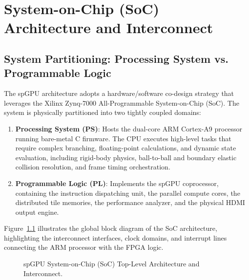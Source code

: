 \chapter{System-on-Chip (SoC) Architecture and Interconnect}
\label{chap:soc_architecture}

\section{System Partitioning: Processing System vs. Programmable Logic}
The spGPU architecture adopts a hardware/software co-design strategy that leverages the Xilinx Zynq-7000 All-Programmable System-on-Chip (SoC). The system is physically partitioned into two tightly coupled domains:
\begin{enumerate}
    \item \textbf{Processing System (PS)}: Hosts the dual-core ARM Cortex-A9 processor running bare-metal C firmware. The CPU executes high-level tasks that require complex branching, floating-point calculations, and dynamic state evaluation, including rigid-body physics, ball-to-ball and boundary elastic collision resolution, and frame timing orchestration.
    \item \textbf{Programmable Logic (PL)}: Implements the spGPU coprocessor, containing the instruction dispatching unit, the parallel compute cores, the distributed tile memories, the performance analyzer, and the physical HDMI output engine.
\end{enumerate}

Figure~\ref{fig:soc_overview} illustrates the global block diagram of the SoC architecture, highlighting the interconnect interfaces, clock domains, and interrupt lines connecting the ARM processor with the FPGA logic.

\begin{figure}[htbp]
\centering
\resizebox{0.95\textwidth}{!}{
    
}
\caption{spGPU System-on-Chip (SoC) Top-Level Architecture and Interconnect.}
\label{fig:soc_overview}
\end{figure}

